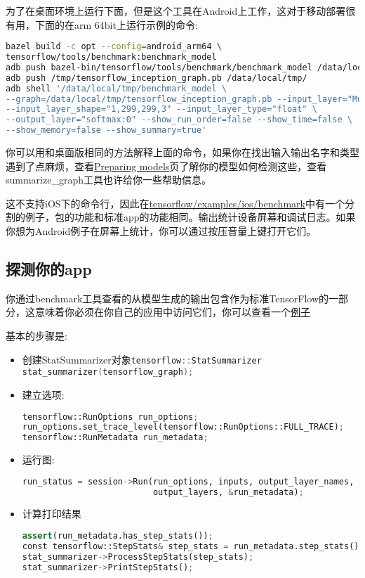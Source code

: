 为了在桌面环境上运行下面，但是这个工具在Android上工作，这对于移动部署很有用，下面的在arm 64bit上运行示例的命令:
\begin{lstlisting}[language=Bash]
bazel build -c opt --config=android_arm64 \ 
tensorflow/tools/benchmark:benchmark_model
adb push bazel-bin/tensorflow/tools/benchmark/benchmark_model /data/local/tmp
adb push /tmp/tensorflow_inception_graph.pb /data/local/tmp/
adb shell '/data/local/tmp/benchmark_model \
--graph=/data/local/tmp/tensorflow_inception_graph.pb --input_layer="Mul" \
--input_layer_shape="1,299,299,3" --input_layer_type="float" \
--output_layer="softmax:0" --show_run_order=false --show_time=false \
--show_memory=false --show_summary=true'
\end{lstlisting}
你可以用和桌面版相同的方法解释上面的命令，如果你在找出输入输出名字和类型遇到了点麻烦，查看\href{https://www.tensorflow.org/mobile/prepare_models?hl=zh-cn}{Preparing models}页了解你的模型如何检测这些，查看summarize\_graph工具也许给你一些帮助信息。

这不支持iOS下的命令行，因此在\href{https://www.github.com/tensorflow/tensorflow/blob/r1.4/tensorflow/examples/ios/benchmark}{tensorflow/examples/ios/benchmark}中有一个分割的例子，包的功能和标准app的功能相同。输出统计设备屏幕和调试日志。如果你想为Android例子在屏幕上统计，你可以通过按压音量上键打开它们。

\subsection{探测你的app}
你通过benchmark工具查看的从模型生成的输出包含作为标准TensorFlow的一部分，这意味着你必须在你自己的应用中访问它们，你可以查看一个\href{https://www.github.com/tensorflow/tensorflow/blob/r1.4/tensorflow/examples/ios/benchmark/BenchmarkViewController.mm?l=139}{例子}

基本的步骤是:
\begin{itemize}
\item 创建StatSummarizer对象\lstinline[language=C++]{tensorflow::StatSummarizer stat_summarizer(tensorflow_graph);}
\item 建立选项:
\begin{lstlisting}[language=Python]
tensorflow::RunOptions run_options;
run_options.set_trace_level(tensorflow::RunOptions::FULL_TRACE);
tensorflow::RunMetadata run_metadata;
\end{lstlisting}
\item 运行图:
\begin{lstlisting}[language=Python]
run_status = session->Run(run_options, inputs, output_layer_names, {},
                          output_layers, &run_metadata);

\end{lstlisting}
\item 计算打印结果\begin{lstlisting}[language=Python]
assert(run_metadata.has_step_stats());
const tensorflow::StepStats& step_stats = run_metadata.step_stats();
stat_summarizer->ProcessStepStats(step_stats);
stat_summarizer->PrintStepStats();
\end{lstlisting}
\end{itemize}
